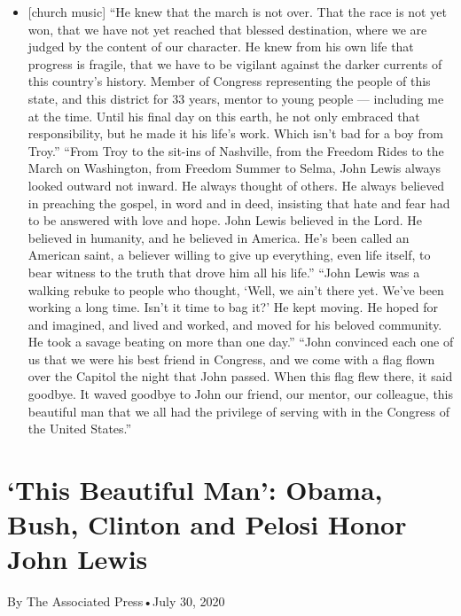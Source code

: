 \begin{itemize}
\tightlist
\item
  {[}church music{]} ``He knew that the march is not over. That the race
  is not yet won, that we have not yet reached that blessed destination,
  where we are judged by the content of our character. He knew from his
  own life that progress is fragile, that we have to be vigilant against
  the darker currents of this country's history. Member of Congress
  representing the people of this state, and this district for 33 years,
  mentor to young people --- including me at the time. Until his final
  day on this earth, he not only embraced that responsibility, but he
  made it his life's work. Which isn't bad for a boy from Troy.'' ``From
  Troy to the sit-ins of Nashville, from the Freedom Rides to the March
  on Washington, from Freedom Summer to Selma, John Lewis always looked
  outward not inward. He always thought of others. He always believed in
  preaching the gospel, in word and in deed, insisting that hate and
  fear had to be answered with love and hope. John Lewis believed in the
  Lord. He believed in humanity, and he believed in America. He's been
  called an American saint, a believer willing to give up everything,
  even life itself, to bear witness to the truth that drove him all his
  life.'' ``John Lewis was a walking rebuke to people who thought,
  `Well, we ain't there yet. We've been working a long time. Isn't it
  time to bag it?' He kept moving. He hoped for and imagined, and lived
  and worked, and moved for his beloved community. He took a savage
  beating on more than one day.'' ``John convinced each one of us that
  we were his best friend in Congress, and we come with a flag flown
  over the Capitol the night that John passed. When this flag flew
  there, it said goodbye. It waved goodbye to John our friend, our
  mentor, our colleague, this beautiful man that we all had the
  privilege of serving with in the Congress of the United States.''
\end{itemize}

\hypertarget{this-beautiful-man-obama-bush-clinton-and-pelosi-honor-john-lewis-1}{%
\section{`This Beautiful Man': Obama, Bush, Clinton and Pelosi Honor
John
Lewis}\label{this-beautiful-man-obama-bush-clinton-and-pelosi-honor-john-lewis-1}}

By The Associated Press•July 30, 2020

